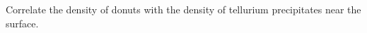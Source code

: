 

Correlate the density of donuts with the density of tellurium precipitates near the surface.





